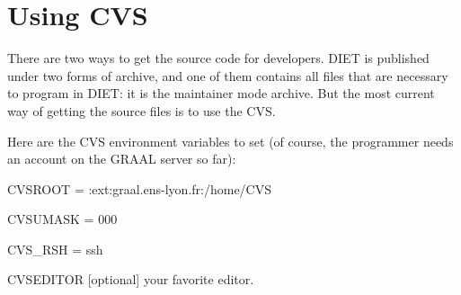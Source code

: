 

\section{Using CVS}

There are two ways to get the source code for developers. DIET is
published under two forms of archive, and one of them contains all
files that are necessary to program in DIET: it is the maintainer mode
archive. But the most current way of getting the source files is to
use the CVS.

Here are the CVS environment variables to set (of course, the
programmer needs an account on the GRAAL server so far):
\begin{description}
\item{\sf CVSROOT} \textsf{ = :ext:graal.ens-lyon.fr:/home/CVS}
\item{\sf CVSUMASK} \textsf{ = 000}
\item{\sf CVS\_RSH} \textsf{ = ssh}
\item{\sf CVSEDITOR [optional]} your favorite editor.
\end{description}

